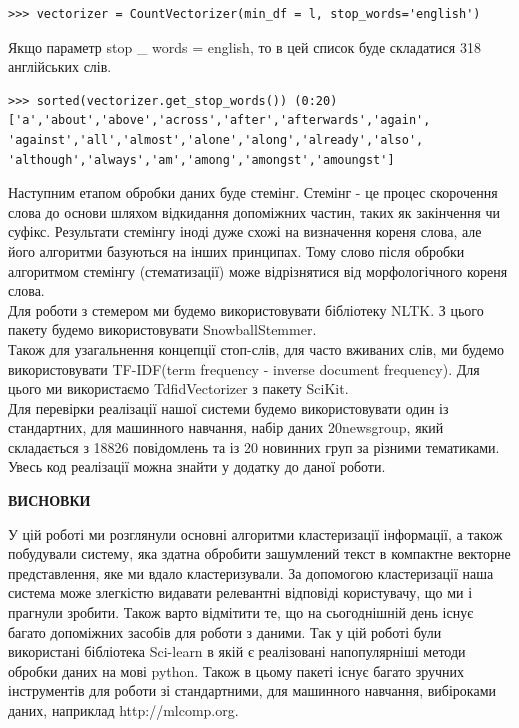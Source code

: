 \documentclass[a4paper,14pt,russian]{extreport}
\newcommand{\empline}{\mbox{}\newline}
\newcommand{\likechapterheading}[1]{
\begin{center}
     \textbf{\MakeUppercase{#1}}
     \end{center}
         \empline}
\newcommand{\likechapter}[1]{
\likechapterheading{#1}
\addcontentsline{toc}{likechapter}{\MakeUppercase{#1}}}
\begin{document}
\begin{lstlisting}[frame=single]  
>>> vectorizer = CountVectorizer(min_df = l, stop_words='english')
\end{lstlisting}
Якщо параметр stop \_ words = english, то в цей список буде складатися 318 англійських слів.

\begin{lstlisting}[frame=single]  
>>> sorted(vectorizer.get_stop_words()) (0:20)
['a','about','above','across','after','afterwards','again',
'against','all','almost','alone','along','already','also',
'although','always','am','among','amongst','amoungst']
\end{lstlisting}

Наступним етапом обробки даних буде стемінг. Стемінг - це процес скорочення слова до основи шляхом відкидання допоміжних частин, таких як закінчення чи суфікс. Результати стемінгу іноді дуже схожі на визначення кореня слова, але його алгоритми базуються на інших принципах. Тому слово після обробки алгоритмом стемінгу (стематизації) може відрізнятися від морфологічного кореня слова.
\\

Для роботи з стемером ми будемо використовувати бібліотеку NLTK. З цього пакету будемо використовувати SnowballStemmer. \\ 

Також для узагальнення концепції стоп-слів, для часто вживаних слів, ми будемо використовувати TF-IDF(term frequency - inverse document frequency). Для цього ми використаємо TdfidVectorizer з пакету SciKit. \\


Для перевірки реалізації нашої системи будемо використовувати один із стандартних, для машинного навчання, набір даних 20newsgroup, який складається з 18826 повідомлень та із 20 новинних груп за різними тематиками. Увесь код реалізації можна знайти у додатку до даної роботи.

\newpage
\likechapter{Висновки}
\par
У цій роботі ми розглянули основні алгоритми кластеризації інформації, а також побудували систему, яка здатна обробити зашумлений текст в компактне векторне представлення, яке ми вдало кластеризували. За допомогою кластеризації наша система може злегкістю видавати релевантні відповіді користувачу, що ми і прагнули зробити. Також варто відмітити те, що на сьогоднішній день існує багато допоміжних засобів для роботи з даними. Так у цій роботі були використані бібліотека Sci-learn в якій є реалізовані напопулярніші методи обробки даних на мові python. Також  в цьому пакеті існує багато зручних інструментів для роботи зі стандартними, для машинного навчання, вибіроками даних, наприклад http://mlcomp.org.
\newpage
\end{document}
